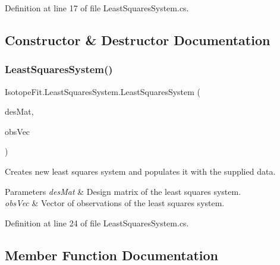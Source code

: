Definition at line 17 of file Least\+Squares\+System.\+cs.



\subsection{Constructor \& Destructor Documentation}
\mbox{\label{class_isotope_fit_1_1_least_squares_system_aec0b3973e7239d006b752a4e079f80d0}} 
\subsubsection{\texorpdfstring{Least\+Squares\+System()}{LeastSquaresSystem()}}
{\footnotesize\ttfamily Isotope\+Fit.\+Least\+Squares\+System.\+Least\+Squares\+System (\begin{DoxyParamCaption}\item[{Sparse\+Matrix}]{des\+Mat,  }\item[{Vector$<$ double $>$}]{obs\+Vec }\end{DoxyParamCaption})}



Creates new least squares system and populates it with the supplied data. 


\begin{DoxyParams}{Parameters}
{\em des\+Mat} & Design matrix of the least squares system.\\
\hline
{\em obs\+Vec} & Vector of observations of the least squares system.\\
\hline
\end{DoxyParams}


Definition at line 24 of file Least\+Squares\+System.\+cs.



\subsection{Member Function Documentation}
\mbox{\label{class_isotope_fit_1_1_least_squares_system_ac72b8568e9ecb97077102658f56aba3f}} 
